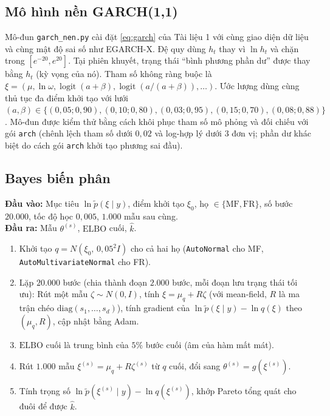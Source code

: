 \documentclass[12pt,a4paper]{article}
\newcounter{thuattoan}
\newenvironment{thuattoan}[1]{%
  \refstepcounter{thuattoan}%
  \begin{tcolorbox}[enhanced,breakable,colback=nenkhung,colframe=vienkhung,boxrule=0.5pt,arc=1mm,
    left=6pt,right=6pt,top=4pt,bottom=4pt,
    title={\textbf{Thuật toán \thethuattoan.} #1},coltitle=black,colbacktitle=nenkhung!60!vienkhung!25]%
  \small
}{\end{tcolorbox}}
\theoremstyle{remark}
\newcommand{\ELBO}{\mathrm{ELBO}}
\newcommand{\Ncal}{N}
\newcommand{\ma}[1]{\texttt{\small #1}}
\begin{document}
\subsection{Mô hình nền GARCH(1,1)}

Mô-đun \ma{garch\_nen.py} cài đặt \eqref{eq:garch} của Tài liệu 1 với cùng giao diện dữ liệu và cùng mật độ sai số như EGARCH-X. Đệ quy dùng $h_t$ thay vì $\ln h_t$ và chặn trong $[e^{-20},e^{20}]$. Tại phiên khuyết, trạng thái ``bình phương phần dư'' được thay bằng $h_t$ (kỳ vọng của nó). Tham số không ràng buộc là $\xi=(\mu,\ln\omega,\operatorname{logit}(a+\beta),\operatorname{logit}(a/(a+\beta)),\dots)$. Ước lượng dùng cùng thủ tục đa điểm khởi tạo với lưới $(a,\beta)\in\{(0{,}05;0{,}90),(0{,}10;0{,}80),(0{,}03;0{,}95),(0{,}15;0{,}70),(0{,}08;0{,}88)\}$. Mô-đun được kiểm thử bằng cách khôi phục tham số mô phỏng và đối chiếu với gói \ma{arch} (chênh lệch tham số dưới $0{,}02$ và log-hợp lý dưới $3$ đơn vị; phần dư khác biệt do cách gói \ma{arch} khởi tạo phương sai đầu).

\subsection{Bayes biến phân}

\begin{thuattoan}{Biến phân mean-field và full-rank (hàm \ma{vb})}
\textbf{Đầu vào:} Mục tiêu $\ln\tilde p(\xi\mid y)$, điểm khởi tạo $\xi_0$, họ $\in\{\text{MF},\text{FR}\}$, số bước $20.000$, tốc độ học $0{,}005$, $1.000$ mẫu sau cùng.\\
\textbf{Đầu ra:} Mẫu $\theta^{(s)}$, $\ELBO$ cuối, $\hat k$.
\begin{enumerate}
\item Khởi tạo $q=\Ncal(\xi_0,\,0{,}05^2I)$ cho cả hai họ (\ma{AutoNormal} cho MF, \ma{AutoMultivariateNormal} cho FR).
\item Lặp $20.000$ bước (chia thành đoạn $2.000$ bước, mỗi đoạn lưu trạng thái tối ưu): Rút một mẫu $\zeta\sim\Ncal(0,I)$, tính $\xi=\mu_q+R\zeta$ (với mean-field, $R$ là ma trận chéo $\mathrm{diag}(s_1,\dots,s_d)$), tính gradient của $\ln\tilde p(\xi\mid y)-\ln q(\xi)$ theo $(\mu_q,R)$, cập nhật bằng Adam.
\item $\ELBO$ cuối là trung bình của $5\%$ bước cuối (âm của hàm mất mát).
\item Rút $1.000$ mẫu $\xi^{(s)}=\mu_q+R\zeta^{(s)}$ từ $q$ cuối, đổi sang $\theta^{(s)}=g(\xi^{(s)})$.
\item Tính trọng số $\ln\tilde p(\xi^{(s)}\mid y)-\ln q(\xi^{(s)})$, khớp Pareto tổng quát cho đuôi để được $\hat k$.
\end{enumerate}
\end{thuattoan}
\end{document}
